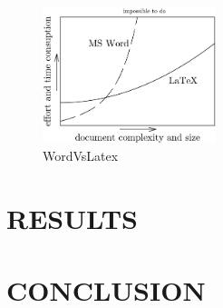 \begin{multicols}{2}
\lipsum[2]

\begin{figure}[H]
\centering
\includegraphics[width=0.45\textwidth]{pics/WordVsLatex}
\caption{WordVsLatex}
\label{fig:WordVsLatex}
\end{figure}

\section{RESULTS}

\lipsum[2]

\section{CONCLUSION}

\lipsum[2]


\printbibliography


\end{multicols}


